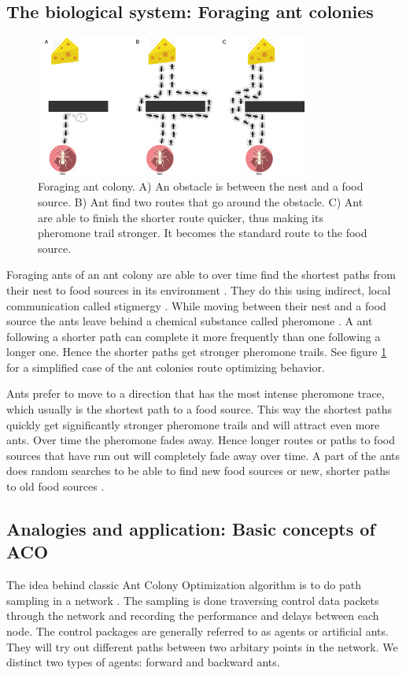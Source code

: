 \documentclass[cameraready]{IWORK2014}
\begin{document}
\subsection{The biological system: Foraging ant colonies}

\begin{figure}
    \centering
    \includegraphics[width=0.8\textwidth]{aco.png}
    \caption{Foraging ant colony. A) An obstacle is between the nest and a food source. B) Ant find two routes that go around the obstacle. C) Ant are able to finish the shorter route quicker, thus making its pheromone trail stronger. It becomes the standard route to the food source.}
    \label{fig:aco}
\end{figure}

Foraging ants of an ant colony are able to over time find the shortest paths from their nest to food sources in its environment \cite{dorigo1999ant, goss1989self}. They do this using indirect, local communication called stigmergy \cite{grasse1959reconstruction}. While moving between their nest and a food source the ants leave behind a chemical substance called pheromone \cite{ghosh2008aggregation}. A ant following a shorter path can complete it more frequently than one following a longer one. Hence the shorter paths get stronger pheromone trails. See figure \ref{fig:aco} for a simplified case of the ant colonies route optimizing behavior. 

Ants prefer to move to a direction that has the most intense pheromone trace, which usually is the shortest path to a food source. This way the shortest paths quickly get significantly stronger pheromone trails and will attract even more ants. Over time the pheromone fades away. Hence longer routes or paths to food sources that have run out will completely fade away over time. A part of the ants does random searches to be able to find new food sources or new, shorter paths to old food sources \cite{dressler2010bio}.

\subsection{Analogies and application: Basic concepts of ACO}
The idea behind classic Ant Colony Optimization algorithm is to do path sampling in a network \cite{di2004ant, di2008theory}. The sampling is done traversing control data packets through the network and recording the performance and delays between each node. The control packages are generally referred to as agents or artificial ants. They will try out different paths between two arbitary points in the network. We distinct two types of agents: forward and backward ants.
\end{document}
